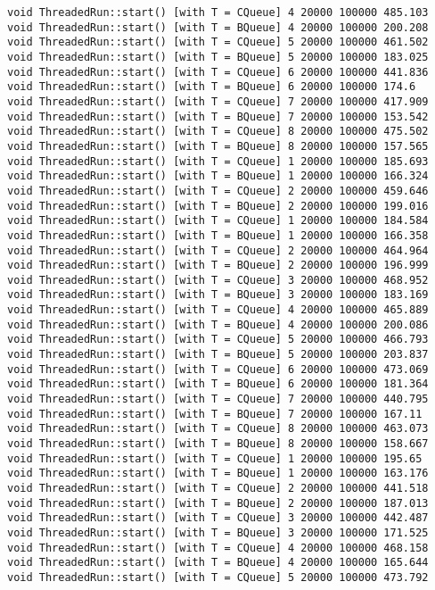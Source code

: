\begin{verbatim}
void ThreadedRun::start() [with T = CQueue] 4 20000 100000 485.103
void ThreadedRun::start() [with T = BQueue] 4 20000 100000 200.208
void ThreadedRun::start() [with T = CQueue] 5 20000 100000 461.502
void ThreadedRun::start() [with T = BQueue] 5 20000 100000 183.025
void ThreadedRun::start() [with T = CQueue] 6 20000 100000 441.836
void ThreadedRun::start() [with T = BQueue] 6 20000 100000 174.6
void ThreadedRun::start() [with T = CQueue] 7 20000 100000 417.909
void ThreadedRun::start() [with T = BQueue] 7 20000 100000 153.542
void ThreadedRun::start() [with T = CQueue] 8 20000 100000 475.502
void ThreadedRun::start() [with T = BQueue] 8 20000 100000 157.565
void ThreadedRun::start() [with T = CQueue] 1 20000 100000 185.693
void ThreadedRun::start() [with T = BQueue] 1 20000 100000 166.324
void ThreadedRun::start() [with T = CQueue] 2 20000 100000 459.646
void ThreadedRun::start() [with T = BQueue] 2 20000 100000 199.016
void ThreadedRun::start() [with T = CQueue] 1 20000 100000 184.584
void ThreadedRun::start() [with T = BQueue] 1 20000 100000 166.358
void ThreadedRun::start() [with T = CQueue] 2 20000 100000 464.964
void ThreadedRun::start() [with T = BQueue] 2 20000 100000 196.999
void ThreadedRun::start() [with T = CQueue] 3 20000 100000 468.952
void ThreadedRun::start() [with T = BQueue] 3 20000 100000 183.169
void ThreadedRun::start() [with T = CQueue] 4 20000 100000 465.889
void ThreadedRun::start() [with T = BQueue] 4 20000 100000 200.086
void ThreadedRun::start() [with T = CQueue] 5 20000 100000 466.793
void ThreadedRun::start() [with T = BQueue] 5 20000 100000 203.837
void ThreadedRun::start() [with T = CQueue] 6 20000 100000 473.069
void ThreadedRun::start() [with T = BQueue] 6 20000 100000 181.364
void ThreadedRun::start() [with T = CQueue] 7 20000 100000 440.795
void ThreadedRun::start() [with T = BQueue] 7 20000 100000 167.11
void ThreadedRun::start() [with T = CQueue] 8 20000 100000 463.073
void ThreadedRun::start() [with T = BQueue] 8 20000 100000 158.667
void ThreadedRun::start() [with T = CQueue] 1 20000 100000 195.65
void ThreadedRun::start() [with T = BQueue] 1 20000 100000 163.176
void ThreadedRun::start() [with T = CQueue] 2 20000 100000 441.518
void ThreadedRun::start() [with T = BQueue] 2 20000 100000 187.013
void ThreadedRun::start() [with T = CQueue] 3 20000 100000 442.487
void ThreadedRun::start() [with T = BQueue] 3 20000 100000 171.525
void ThreadedRun::start() [with T = CQueue] 4 20000 100000 468.158
void ThreadedRun::start() [with T = BQueue] 4 20000 100000 165.644
void ThreadedRun::start() [with T = CQueue] 5 20000 100000 473.792

\end{verbatim}
